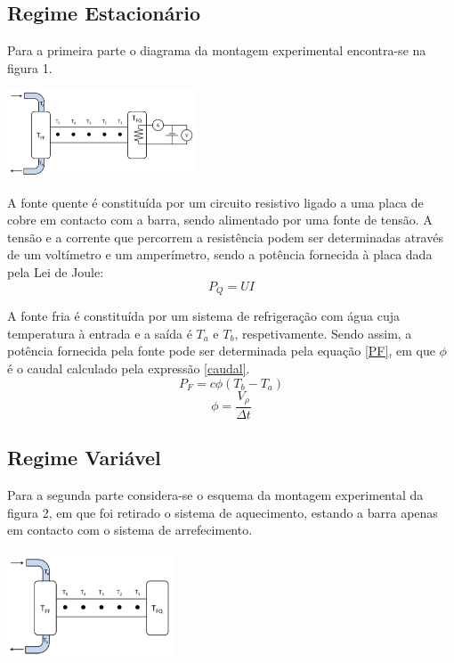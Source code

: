 \documentclass[9pt]{extarticle}
\begin{document}
\begin{multicols}{2}
\subsection*{Regime Estacionário}
Para a primeira parte o diagrama da montagem experimental encontra-se na figura 1. 

\begin{center}
\includegraphics[width=160pt]{figura1.jpg}
\par{}
\end{center}

\par A fonte quente é constituída por um circuito resistivo ligado a uma placa de cobre em contacto com a barra, sendo alimentado por uma fonte de tensão. A tensão e a corrente que percorrem a resistência podem ser determinadas através de um voltímetro e um amperímetro, sendo a potência fornecida à placa dada pela Lei de Joule:
\begin{equation}
P_Q = U I
\end{equation}
\par A fonte fria é constituída por um sistema de refrigeração com água cuja temperatura à entrada e a saída é $T_a$ e $T_b$, respetivamente. Sendo assim, a potência fornecida pela fonte pode ser determinada pela equação \ref{PF}, em que $\phi$ é o caudal calculado pela expressão \ref{caudal}.
\begin{equation}\label{PF}
P_F = c \phi (T_b - T_a)
\end{equation}
\begin{equation} \label{caudal}
\phi = \frac{V_\rho}{\Delta t}
\end{equation}

\subsection*{Regime Variável}
Para a segunda parte considera-se o esquema da montagem experimental da figura 2, em que foi retirado o sistema de aquecimento, estando a barra apenas em contacto com o sistema de arrefecimento.

\begin{center}
\includegraphics[width=140pt]{figura2.jpg}
\par{}
\end{center}








\end{multicols}
\end{document}
